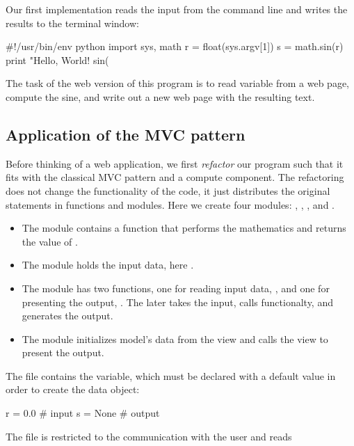 \documentclass[%
oneside,                 %
final,                   %
10pt]{article}
\begin{document}
Our first implementation reads the input from the command
line and writes the results to the terminal window:

\bpypro
#!/usr/bin/env python
import sys, math
r = float(sys.argv[1])
s = math.sin(r)
print "Hello, World! sin(%
\epypro

The task of the web version of this program is to read 
variable from a web page, compute the sine,
and write out a new web page with the resulting text.

\subsection{Application of the MVC pattern}
\label{wf:hw:mvc}



Before thinking of a web application, we first \emph{refactor} our program
such that it fits with the classical MVC pattern and a compute component.
The refactoring does not change the functionality of the code, it
just distributes the original statements in functions and modules.
Here we create four modules: , ,
, and .

\begin{itemize}
 \item The  module contains a function  that performs
   the mathematics and returns the value of .

 \item The  module holds the input data, here .

 \item The  module has two functions, one for reading input data,
   ,
   and one for presenting the output, .
   The later takes the input, calls  functionalty, and
   generates the output.

 \item The  module initializes model's data from the view
   and calls the view to present the output.
\end{itemize}

\noindent
The  file contains the  variable, which must
be declared with a default value in order to create the data object:

\bpypro
r = 0.0    # input
s = None   # output
\epypro

The  file is restricted to the communication with the user and reads
\end{document}
